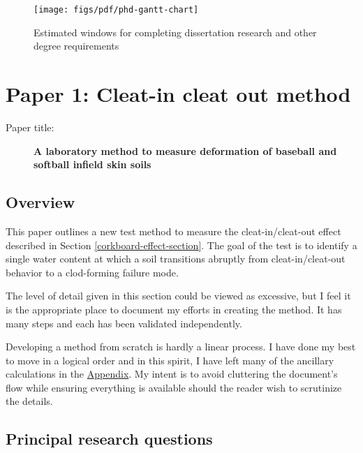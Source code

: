 \documentclass[
  letterpaper,
  openany]{book}
\begin{document}
\begin{figure}

{\centering \texttt{[image: figs/pdf/phd-gantt-chart]} 

}

\caption[Project Gantt chart]{Estimated windows for completing dissertation research and other degree requirements}\label{fig:gantt-chart}
\end{figure}

\hypertarget{cleatmark-method-development-chapter}{%
\section{Paper 1: Cleat-in cleat out method}\label{cleatmark-method-development-chapter}}

\begin{description}
\item[Paper title:]
\textbf{A laboratory method to measure deformation of baseball and softball infield skin soils}
\end{description}

\hypertarget{overview}{%
\subsection{Overview}\label{overview}}

This paper outlines a new test method to measure the cleat-in/cleat-out effect described in Section \ref{corkboard-effect-section}.
The goal of the test is to identify a single water content at which a soil transitions abruptly from cleat-in/cleat-out behavior to a clod-forming failure mode.

The level of detail given in this section could be viewed as excessive, but I feel it is the appropriate place to document my efforts in creating the method.
It has many steps and each has been validated independently.

Developing a method from scratch is hardly a linear process.
I have done my best to move in a logical order and in this spirit, I have left many of the ancillary calculations in the \protect\hyperlink{appendix}{Appendix}.
My intent is to avoid cluttering the document's flow while ensuring everything is available should the reader wish to scrutinize the details.

\hypertarget{principal-research-questions}{%
\subsection{Principal research questions}\label{principal-research-questions}}
\end{document}

